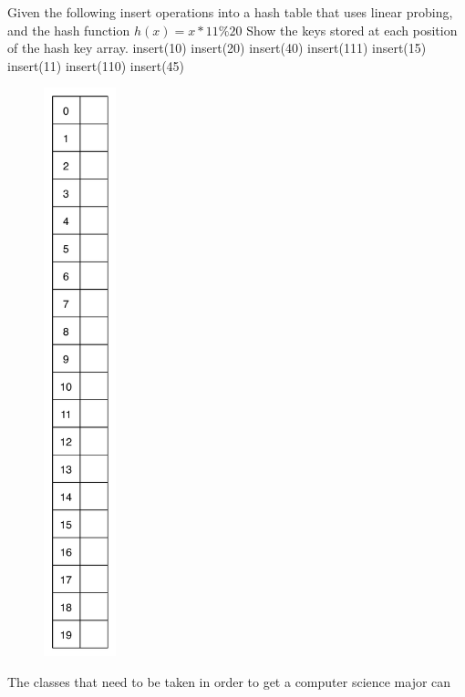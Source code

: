 \documentclass[11pt,letter]{exam}
\begin{document}
\begin{questions}

\newpage
\question[10]
Given the following insert operations into a hash table that uses linear
probing, and the hash function $h(x) = x * 11 \% 20 $  Show the keys stored at
each position of the hash key array.
insert(10)
insert(20)
insert(40)
insert(111)
insert(15)
insert(11)
insert(110)
insert(45)
\begin{figure}[h]
  \includegraphics[height=6.5in]{HashTab.pdf}
\end{figure}
\newpage
\question[20]
The classes that need to be taken in order to get a computer science major can

\end{questions}
\end{document}
